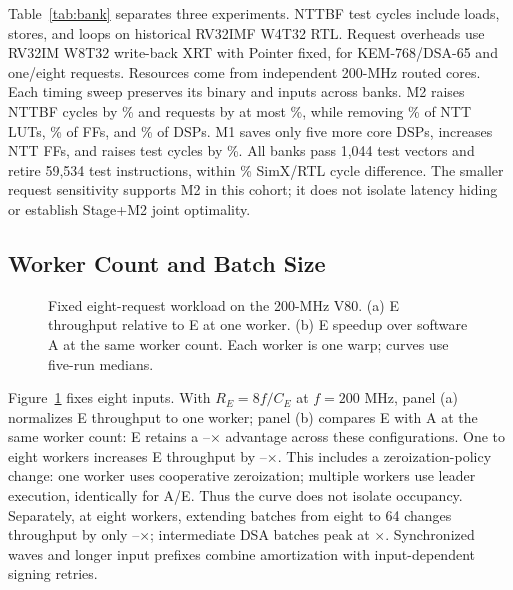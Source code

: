 \documentclass[conference,letterpaper]{IEEEtran}
\begin{document}
Table~\ref{tab:bank} separates three experiments. NTTBF test cycles include
loads, stores, and loops on historical RV32IMF W4T32 RTL. Request overheads
use RV32IM W8T32 write-back XRT with Pointer fixed, for KEM-768/DSA-65 and
one/eight requests. Resources come from independent 200-MHz routed cores.
Each timing sweep preserves its binary and inputs across banks.
M2 raises NTTBF cycles by \BankTwoNttPenalty{}\% and requests by at most
\BankTwoEndToEndMax{}\%, while removing \BankTwoNttLutSaved{}\% of NTT LUTs,
\BankTwoNttFfSaved{}\% of FFs, and \BankTwoNttDspSaved{}\% of DSPs.
M1 saves only five more core DSPs, increases NTT FFs, and raises test cycles
by \BankOneNttPenalty{}\%. All banks pass 1,044 test vectors and retire
59,534 test instructions, within \BankParityMax{}\% SimX/RTL cycle difference.
The smaller request sensitivity supports M2 in this cohort; it does not
isolate latency hiding or establish Stage+M2 joint optimality.

\subsection{Worker Count and Batch Size}
\begin{figure}[t]
\centering
\caption{Fixed eight-request workload on the 200-MHz V80.
(a) E throughput relative to E at one worker.
(b) E speedup over software A at the same worker count.
Each worker is one warp; curves use five-run medians.}
\label{fig:scaling}
\end{figure}
Figure~\ref{fig:scaling} fixes eight inputs. With $R_E=8f/C_E$ at
$f=200$ MHz, panel (a) normalizes E throughput to one worker; panel (b)
compares E with A at the same worker count: E retains a \ParameterWorkerSpeedupMin{}--\ParameterWorkerSpeedupMax{}$\times$
advantage across these configurations. One to eight workers increases
E throughput by \ParameterOccupancyMin{}--\ParameterOccupancyMax{}$\times$.
This includes a zeroization-policy change: one worker uses cooperative
zeroization; multiple workers use leader execution, identically for A/E.
Thus the curve does not isolate occupancy. Separately, at eight workers,
extending batches from eight to 64 changes throughput by only
\ParameterBatchMin{}--\ParameterBatchMax{}$\times$; intermediate DSA batches
peak at \ParameterBatchPeak{}$\times$. Synchronized waves and longer input
prefixes combine amortization with input-dependent signing retries.
\end{document}
